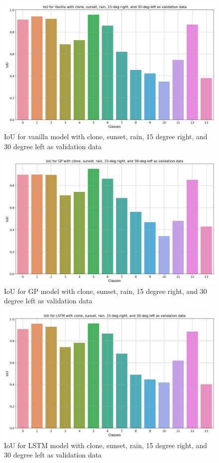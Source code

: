 	\begin{figure}
		\centering
	
		\includegraphics[width=12cm]{images/iou_vanilla_vkitti_five.png}
		\caption{IoU for vanilla model with clone, sunset, rain, 15 degree right, and 30 degree left as validation data}
		\label{fig:performance_metric_unet1}
	\end{figure}
	
	\begin{figure}
		\centering
		
		\includegraphics[width=12cm]{images/IoU_vkitti_GP_five.png}
		\caption{IoU for GP model with clone, sunset, rain, 15 degree right, and 30 degree left as validation data}
		\label{fig:performance_metric_unet2}
	\end{figure}

	\begin{figure}
		\centering
	
		\includegraphics[width=12cm]{images/IoU_vkitti_lstm_five.png}
		\caption{IoU for LSTM model with clone, sunset, rain, 15 degree right, and 30 degree left as validation data}
		\label{fig:performance_metric_unet3}
	\end{figure}

